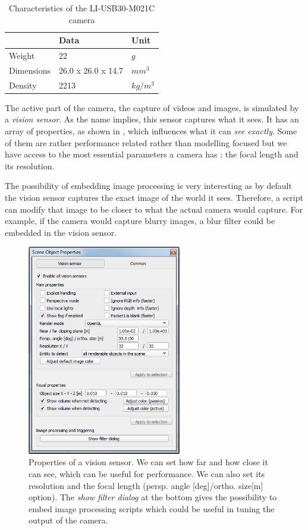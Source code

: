 \begin{table}[htp]
\center
\begin{tabularx}{\textwidth}{@{}X X X @{}}
\toprule
 & \textbf{Data} & \textbf{Unit}\\ 
\midrule
Weight & 22 & $g$\\
Dimensions & 26.0 x 26.0 x 14.7 & $mm^3$\\
Density & 2213 & $kg/m^3$\\
\bottomrule
\end{tabularx}
\caption[Characteristics of the LI-USB30-M021C camera]{Characteristics of the LI-USB30-M021C camera}
\label{table:cam_specs}
\end{table}

The active part of the camera, the capture of videos and images, is simulated by a \emph{vision sensor}. As the name implies, this sensor captures what it sees. It has an array of properties, as shown in , which influences what it can \emph{see exactly}. Some of them are rather performance related rather than modelling focused but we have access to the most essential parameters a camera has : the focal length and its resolution.

The possibility of embedding image processing is very interesting as by default the vision sensor captures the exact image of the world it sees. Therefore, a script can modify that image to be closer to what the actual camera would capture. For example, if the camera would capture blurry images, a blur filter could be embedded in the vision sensor.

\begin{figure}[htp]
\center
    \includegraphics[width = 0.6\textwidth]{figures/v-rep_camera}
    \caption[Settings of vision sensor]{Properties of a vision sensor. We can set how far and how close it can see, which can be useful for performance. We can also set its resolution and the focal length (persp. angle [deg]/ortho. size[m] option). The \emph{show filter dialog} at the bottom gives the possibility to embed image processing scripts which could be useful in tuning the output of the camera.}
    \label{fig:camera_model}
\end{figure}

